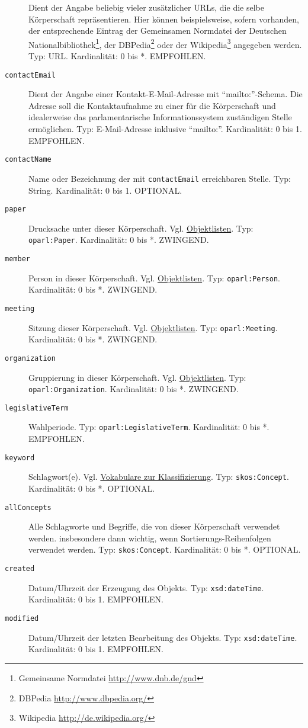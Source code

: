 \documentclass[,a4paper]{article}
\begin{document}
\begin{description}
Dient der Angabe beliebig vieler zusätzlicher URLs, die die selbe
Körperschaft repräsentieren. Hier können beispielsweise, sofern
vorhanden, der entsprechende Eintrag der Gemeinsamen Normdatei der
Deutschen Nationalbibliothek\footnote{Gemeinsame Normdatei
  \url{http://www.dnb.de/gnd}}, der DBPedia\footnote{DBPedia
  \url{http://www.dbpedia.org/}} oder der Wikipedia\footnote{Wikipedia
  \url{http://de.wikipedia.org/}} angegeben werden. Typ: URL.
Kardinalität: 0 bis *. EMPFOHLEN.
\item[\texttt{contactEmail}]
Dient der Angabe einer Kontakt-E-Mail-Adresse mit ``mailto:''-Schema.
Die Adresse soll die Kontaktaufnahme zu einer für die Körperschaft und
idealerweise das parlamentarische Informationssystem zuständigen Stelle
ermöglichen. Typ: E-Mail-Adresse inklusive ``mailto:''. Kardinalität: 0
bis 1. EMPFOHLEN.
\item[\texttt{contactName}]
Name oder Bezeichnung der mit \texttt{contactEmail} erreichbaren Stelle.
Typ: String. Kardinalität: 0 bis 1. OPTIONAL.
\item[\texttt{paper}]
Drucksache unter dieser Körperschaft. Vgl.
\hyperref[objektlisten]{Objektlisten}. Typ: \texttt{oparl:Paper}.
Kardinalität: 0 bis *. ZWINGEND.
\item[\texttt{member}]
Person in dieser Körperschaft. Vgl.
\hyperref[objektlisten]{Objektlisten}. Typ: \texttt{oparl:Person}.
Kardinalität: 0 bis *. ZWINGEND.
\item[\texttt{meeting}]
Sitzung dieser Körperschaft. Vgl. \hyperref[objektlisten]{Objektlisten}.
Typ: \texttt{oparl:Meeting}. Kardinalität: 0 bis *. ZWINGEND.
\item[\texttt{organization}]
Gruppierung in dieser Körperschaft. Vgl.
\hyperref[objektlisten]{Objektlisten}. Typ: \texttt{oparl:Organization}.
Kardinalität: 0 bis *. ZWINGEND.
\item[\texttt{legislativeTerm}]
Wahlperiode. Typ: \texttt{oparl:LegislativeTerm}. Kardinalität: 0 bis *.
EMPFOHLEN.
\item[\texttt{keyword}]
Schlagwort(e). Vgl. \hyperref[vokabulareux5fklassifizierung]{Vokabulare
zur Klassifizierung}. Typ: \texttt{skos:Concept}. Kardinalität: 0 bis *.
OPTIONAL.
\item[\texttt{allConcepts}]
Alle Schlagworte und Begriffe, die von dieser Körperschaft verwendet
werden. insbesondere dann wichtig, wenn Sortierungs-Reihenfolgen
verwendet werden. Typ: \texttt{skos:Concept}. Kardinalität: 0 bis *.
OPTIONAL.
\item[\texttt{created}]
Datum/Uhrzeit der Erzeugung des Objekts. Typ: \texttt{xsd:dateTime}.
Kardinalität: 0 bis 1. EMPFOHLEN.
\item[\texttt{modified}]
Datum/Uhrzeit der letzten Bearbeitung des Objekts. Typ:
\texttt{xsd:dateTime}. Kardinalität: 0 bis 1. EMPFOHLEN.
\end{description}
\end{document}
